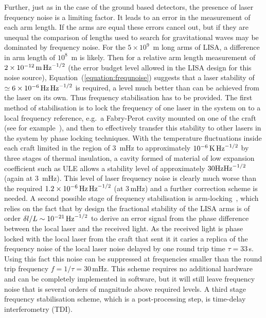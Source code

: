 \documentclass{article}
\begin{document}
Further, just as in the case of the ground based detectors, the presence of
laser frequency noise is a limiting factor. It leads to an error in the
measurement of each arm length. If the arms are equal these errors cancel out,
but if they are unequal the comparison of lengths used to search for
gravitational waves may be dominated by frequency noise. For the $5\times10^9$~m
long arms of LISA, a difference in arm length of $10^8$~m is likely. Then for a
relative arm length measurement of $2 \times 10^{-12}\,{\rm m}\,{\rm Hz}^{-1/2}$
(the error budget level allowed in the LISA design for this noise source),
Equation~(\ref{equation:frequnoise}) suggests that a laser stability of $\simeq
6 \times 10^{-6}\,{\rm Hz}\,{\rm Hz}^{-1/2}$ is required, a level much better
than can be achieved from the laser on its own. Thus frequency stabilisation has
to be provided. The first method of stabilisation is to lock the frequency of
one laser in the system on to a local frequency reference, e.g.\ a Fabry-Perot
cavity mounted on one of the craft (see for example~\cite{McNamara}), and then
to effectively transfer this stability to other lasers in the system by phase
locking techniques. With the temperature fluctuations inside each craft limited
in the region of 3~mHz to approximately $10^{-6}\,{\rm K}\,{\rm Hz}^{-1/2}$ by
three stages of thermal insulation, a cavity formed of material of low expansion
coefficient such as ULE allows a stability level of approximately $30 {\rm
Hz}{\rm Hz}^{-1/2}$ (again at 3~mHz). This level of laser frequency noise is
clearly much worse than the required $1.2 \times 10^{-6}\,{\rm Hz}\,{\rm
Hz}^{-1/2}$ (at 3\,mHz) and a further correction scheme is needed. A second
possible stage of frequency stabilisation is arm-locking~\cite{Sheard:2003},
which relies on the fact that by design the fractional stability of the LISA
arms is of order $\delta{}l/L \sim 10^{-21}\,{\rm Hz}^{-1/2}$ to derive an error
signal from the phase difference between the local laser and the received light.
As the received light is phase locked with the local laser from the craft that
sent it it caries a replica of the frequency noise of the local laser noise
delayed by one round trip time $\tau=33$\,s. Using this fact this noise can be
suppressed at frequencies smaller than the round trip frequency $f= 1/\tau =
30$\,mHz. This scheme requires no additional hardware and can be completely
implemented in software, but it will still leave frequency noise that is several
orders of magnitude above required levels. A third stage frequency stabilisation
scheme, which is a post-processing step, is time-delay interferometry (TDI).
\end{document}
